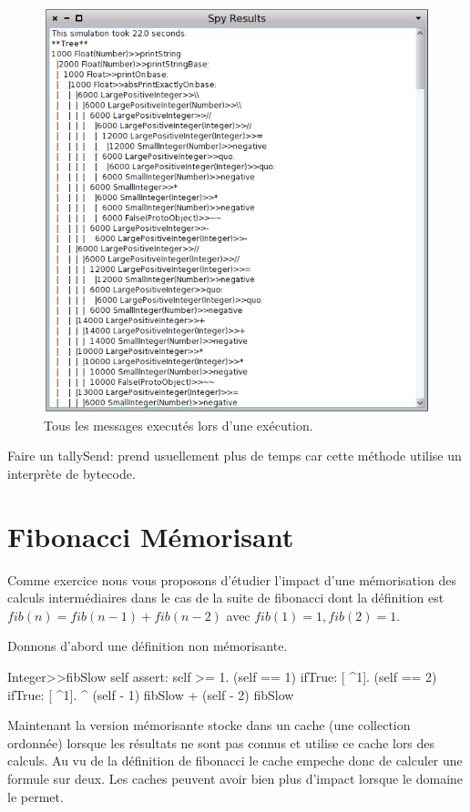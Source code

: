 \documentclass[a4paper,10pt,twoside]{book}
\begin{document}
\begin{figure}
	\begin{center}
	\includegraphics[width=.8\linewidth]{sendTally}
	\caption{Tous les messages execut\'es lors d'une ex\'ecution.}
	\end{center}
\end{figure}

Faire un tallySend: prend usuellement plus de temps car cette m\'ethode utilise un
interpr\`ete de bytecode. 



\section{Fibonacci M\'emorisant}
Comme exercice nous vous proposons d'\'etudier l'impact d'une
m\'emorisation des calculs interm\'ediaires dans le cas de la suite de
fibonacci dont la d\'efinition est $fib (n) = fib (n-1) + fib(n-2)$
avec $fib(1)=1, fib(2)=1$.

Donnons d'abord une d\'efinition non m\'emorisante.
\begin{code}{}
Integer>>fibSlow
	self assert: self >= 1.
	(self == 1) ifTrue: [ ^1].
	(self == 2) ifTrue: [ ^1].
	^ (self - 1) fibSlow + (self - 2) fibSlow
\end{code}

Maintenant la version m\'emorisante stocke dans un cache (une collection ordonn\'ee) 
lorsque les r\'esultats ne sont pas connus  et utilise
ce cache lors des calculs. Au vu de la d\'efinition de fibonacci le
cache empeche donc de calculer une formule sur deux. Les caches peuvent
avoir bien plus d'impact lorsque le domaine
le permet. 
      
\end{document}
